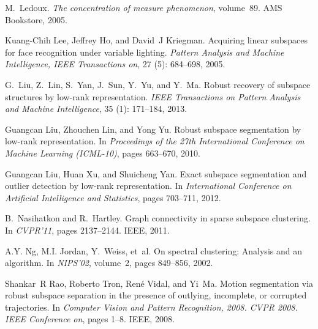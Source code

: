 \documentclass{ctexart}
\begin{document}
\begin{thebibliography}{47}
    M.~Ledoux.
    \newblock \emph{The concentration of measure phenomenon}, volume~89.
    \newblock AMS Bookstore, 2005.

    Kuang-Chih Lee, Jeffrey Ho, and David~J Kriegman.
    \newblock Acquiring linear subspaces for face recognition under variable
    lighting.
    \newblock \emph{Pattern Analysis and Machine Intelligence, IEEE Transactions
    on}, 27 (5): 684--698, 2005.

    G.~Liu, Z.~Lin, S.~Yan, J.~Sun, Y.~Yu, and Y.~Ma.
    \newblock Robust recovery of subspace structures by low-rank representation.
    \newblock \emph{IEEE Transactions on Pattern Analysis and Machine
    Intelligence}, 35 (1): 171--184, 2013.

    Guangcan Liu, Zhouchen Lin, and Yong Yu.
    \newblock Robust subspace segmentation by low-rank representation.
    \newblock In \emph{Proceedings of the 27th International Conference on Machine
    Learning (ICML-10)}, pages 663--670, 2010.

    Guangcan Liu, Huan Xu, and Shuicheng Yan.
    \newblock Exact subspace segmentation and outlier detection by low-rank
    representation.
    \newblock In \emph{International Conference on Artificial Intelligence and
    Statistics}, pages 703--711, 2012.

    B.~Nasihatkon and R.~Hartley.
    \newblock Graph connectivity in sparse subspace clustering.
    \newblock In \emph{CVPR'11}, pages 2137--2144. IEEE, 2011.

    A.Y. Ng, M.I. Jordan, Y.~Weiss, et~al.
    \newblock On spectral clustering: Analysis and an algorithm.
    \newblock In \emph{NIPS'02}, volume~2, pages 849--856, 2002.

    Shankar~R Rao, Roberto Tron, Ren{\'e} Vidal, and Yi~Ma.
    \newblock Motion segmentation via robust subspace separation in the presence of
    outlying, incomplete, or corrupted trajectories.
    \newblock In \emph{Computer Vision and Pattern Recognition, 2008. CVPR 2008.
    IEEE Conference on}, pages 1--8. IEEE, 2008.


\end{thebibliography}
\end{document}
